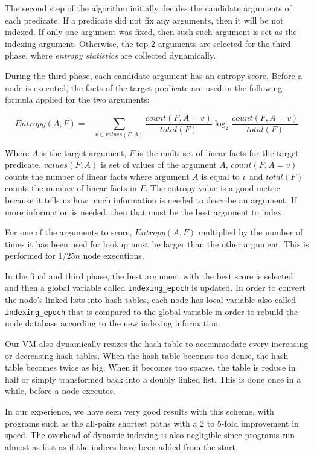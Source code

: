 The second step of the algorithm initially decides the candidate arguments of each predicate.
If a predicate did not fix any arguments, then it will be not indexed.
If only one argument was fixed, then such such argument is set as the indexing argument. Otherwise, the top 2 arguments
are selected for the third phase, where \emph{entropy statistics} are collected dynamically.

During the third phase, each candidate argument has an entropy score.
Before a node is executed, the facts of the target predicate
are used in the following formula applied for the two arguments:

\vspace{-0.5\intextsep}

\[
Entropy(A, F) = - \sum_{v \in values(F, A)} \frac{count(F, A = v)}{total(F)} 	\log_2 \frac{count(F, A = v)}{total(F)}
\]
\vspace{-0.5\intextsep}

Where $A$ is the target argument, $F$ is the multi-set of linear facts for the target predicate, $values(F, A)$ is set of values of the argument $A$, $count(F, A = v)$ counts the number
of linear facts where argument $A$ is equal to $v$ and $total(F)$ counts the number of linear facts in $F$.
The entropy value is a good metric because it tells us how much information is needed to describe an argument.
If more information is needed, then that must be the best argument to index.

For one of the arguments to score, $Entropy(A, F)$ multiplied by the number of times it has been used for lookup must be larger than the other argument. This is performed for $1/25n$ node executions.

In the final and third phase, the best argument with the best score is selected and then
a global variable called \texttt{indexing\_epoch} is updated.
In order to convert the node's linked lists into hash tables, each node has local variable also called \texttt{indexing\_epoch}
that is compared to the global variable in order to rebuild the node database according to the new indexing
information.

Our VM also dynamically resizes the hash table to accommodate every increasing or decreasing hash tables. When the hash table becomes
too dense, the hash table becomes twice as big. When it becomes too sparse, the table is reduce in half
or simply transformed back into a doubly linked list. This is done once in a while, before a node executes.

In our experience, we have seen very good results with this scheme, with programs such as the all-pairs shortest paths with a 2 to 5-fold
improvement in speed. The overhead of dynamic indexing is also negligible since programs run almost as fast
as if the indices have been added from the start.

